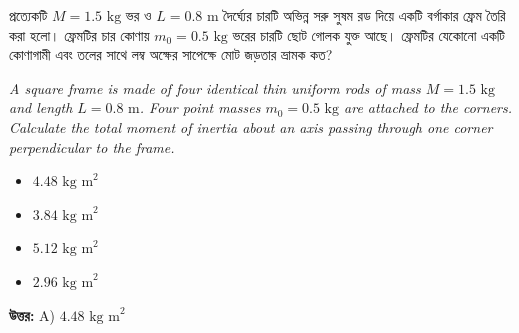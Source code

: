 \documentclass[12pt, a4paper]{article}
\begin{document}
\begin{tcolorbox}[questionbox={প্রশ্ন (Question) 35}]
\noindent
প্রত্যেকটি $M = 1.5\text{ kg}$ ভর ও $L = 0.8\text{ m}$ দৈর্ঘ্যের চারটি অভিন্ন সরু সুষম রড দিয়ে একটি বর্গাকার ফ্রেম তৈরি করা হলো। ফ্রেমটির চার কোণায় $m_0 = 0.5\text{ kg}$ ভরের চারটি ছোট গোলক যুক্ত আছে। ফ্রেমটির যেকোনো একটি কোণাগামী এবং তলের সাথে লম্ব অক্ষের সাপেক্ষে মোট জড়তার ভ্রামক কত?
\vspace{0.8em}
\begin{english}
\noindent\textit{\color{darkgray}
A square frame is made of four identical thin uniform rods of mass $M = 1.5\text{ kg}$ and length $L = 0.8\text{ m}$. Four point masses $m_0 = 0.5\text{ kg}$ are attached to the corners. Calculate the total moment of inertia about an axis passing through one corner perpendicular to the frame.
}
\end{english}
\end{tcolorbox}

\begin{itemize}[label={}, leftmargin=1cm, itemsep=0.5em]
\item[\textbf{A)}] $4.48\text{ kg m}^2$
\item[\textbf{B)}] $3.84\text{ kg m}^2$
\item[\textbf{C)}] $5.12\text{ kg m}^2$
\item[\textbf{D)}] $2.96\text{ kg m}^2$
\end{itemize}
\vspace{0.5em}

\begin{tcolorbox}[answerbox]
\textbf{\color{success} উত্তর:} A) $4.48\text{ kg m}^2$
\end{tcolorbox}
\vspace{1em}
\end{document}
